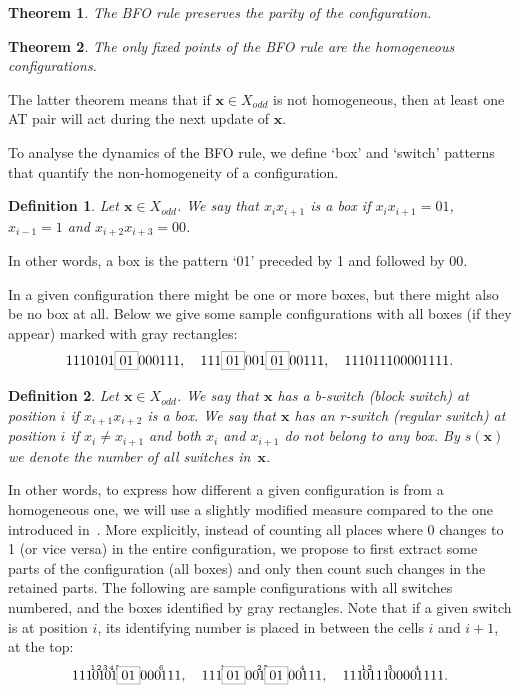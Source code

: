 \documentclass{sn-jnl}
\newtheorem{thm}{Theorem}%
\newtheorem{defn}{Definition}%
\newcommand{\xodd}{X_{odd}}
\newcommand{\bx}{\mathbf{x}}
\newcommand{\gn}[1]{\!^{{}^{{#1}}}\!\!}
\begin{document}
\begin{thm}\label{thm:BFO1}
    The BFO rule preserves the parity of the configuration.
\end{thm}

\begin{thm}\label{thm:BFO2}
    The only fixed points of the BFO rule are the homogeneous configurations.
\end{thm}

\noindent
The latter theorem means that if $\bx\in\xodd$ is not homogeneous, then at least one AT pair will act during the next update of $\bx$.

\bigskip

To analyse the dynamics of the BFO rule, we define `box’ and `switch’ patterns that quantify the non-homogeneity of a configuration.


\begin{defn}
    Let $\bx\in\xodd$. We say that $x_ix_{i+1}$ is a box if $x_ix_{i+1}=01$, $x_{i-1}=1$ and $x_{i+2}x_{i+3}=00$.
\end{defn}

\noindent In other words, a box is the pattern `01' preceded by 1 and followed by 00. 

In a given configuration there might be one or more boxes, but there might also be no box at all. Below we give some sample configurations with all boxes (if they appear) marked with gray rectangles:
\[
1110101\fcolorbox{gray}{white}{01}000111,\quad 111\fcolorbox{gray}{white}{01}001\fcolorbox{gray}{white}{01}00111,\quad 111011100001111.
\]

\begin{defn}\label{def:switch}
Let $\bx\in\xodd$. We say that $\bx$ has a b-switch (block switch) at position $i$ if $x_{i+1}x_{i+2}$ is a box. We say that $\bx$ has an r-switch (regular switch) at position $i$ if $x_i\neq x_{i+1}$ and both $x_i$ and $x_{i+1}$ do not belong to any box. By $s(\bx)$ we denote the number of all switches in~$\bx$.
\end{defn}

 In other words, to express how different a given configuration is from a homogeneous one, we will use a slightly modified measure compared to the one introduced in~\cite{BFO2013}. More explicitly, instead of counting all places where 0 changes to 1 (or vice versa) in the entire configuration, we propose to first extract some parts of the configuration (all boxes) and only then count such changes in the retained parts.
The following are sample configurations with all switches numbered, and the boxes identified by gray rectangles. Note that if a given switch is at position $i$, its identifying number is placed in between the cells $i$ and $i+1$, at the top:
\[
111\gn{1}0\gn{2}1\gn{3}0\gn{4}1\gn{5}\fcolorbox{gray}{white}{01}000\gn{6}111,\quad 111\gn{1}\fcolorbox{gray}{white}{01}00\gn{2}1\gn{3}\fcolorbox{gray}{white}{01}00\gn{4}111,\quad 111\gn{1}0\gn{2}111\gn{3}0000\gn{4}1111.
\]
\end{document}
